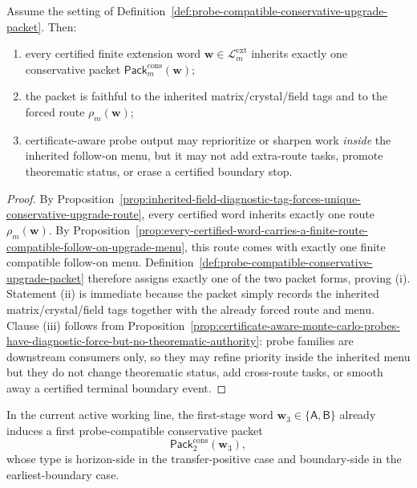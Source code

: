 \begin{proposition}
\label{prop:every-certified-word-inherits-exactly-one-probe-compatible-conservative-upgrade-packet}
Assume the setting of Definition~\ref{def:probe-compatible-conservative-upgrade-packet}. Then:
\begin{enumerate}[label=(\roman*)]
 \item every certified finite extension word \(\mathbf w\in\mathcal L^{\mathrm{ext}}_{m}\) inherits exactly one conservative packet \(\mathsf{Pack}^{\mathrm{cons}}_{m}(\mathbf w)\);
 \item the packet is faithful to the inherited matrix/crystal/field tags and to the forced route \(\rho_m(\mathbf w)\);
 \item certificate-aware probe output may reprioritize or sharpen work \emph{inside} the inherited follow-on menu, but it may not add extra-route tasks, promote theorematic status, or erase a certified boundary stop.
\end{enumerate}
\end{proposition}

\begin{proof}
By Proposition~\ref{prop:inherited-field-diagnostic-tag-forces-unique-conservative-upgrade-route}, every certified word inherits exactly one route \(\rho_m(\mathbf w)\). By Proposition~\ref{prop:every-certified-word-carries-a-finite-route-compatible-follow-on-upgrade-menu}, this route comes with exactly one finite compatible follow-on menu. Definition~\ref{def:probe-compatible-conservative-upgrade-packet} therefore assigns exactly one of the two packet forms, proving (i). Statement (ii) is immediate because the packet simply records the inherited matrix/crystal/field tags together with the already forced route and menu. Clause (iii) follows from Proposition~\ref{prop:certificate-aware-monte-carlo-probes-have-diagnostic-force-but-no-theorematic-authority}: probe families are downstream consumers only, so they may refine priority inside the inherited menu but they do not change theorematic status, add cross-route tasks, or smooth away a certified terminal boundary event.
\end{proof}

\begin{corollary}
\label{cor:present-sigma3-package-already-carries-a-first-conservative-upgrade-packet}
In the current active working line, the first-stage word \(\mathbf w_3\in\{\mathsf A,\mathsf B\}\) already induces a first probe-compatible conservative packet
\[
 \mathsf{Pack}^{\mathrm{cons}}_{2}(\mathbf w_3),
\]
whose type is horizon-side in the transfer-positive case and boundary-side in the earliest-boundary case.
\end{corollary}

